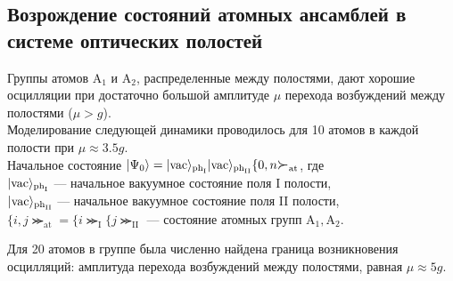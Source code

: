\subsection{Возрождение состояний атомных ансамблей в системе оптических полостей}
Группы атомов $\mathrm{A}_1$ и $\mathrm{A}_2$, распределенные между полостями, дают хорошие осцилляции при достаточно большой амплитуде $\mu$ перехода возбуждений между полостями ($\mu>g$). 
\\[12pt]
Моделирование следующей динамики проводилось для 10 атомов в каждой полости при $\mu \approx 3.5g$.
\\[12pt]
Начальное состояние $|\Psi_0\ra=|\mathrm{vac}\ra_{\mathrm{ph}_\mathrm{I}}|\mathrm{vac}\ra_{\mathrm{ph}_{\mathrm{II}}}\{0, n\Succ_{\mathrm{at}}$, где
\\
\indent$|\mathrm{vac}\rangle_{\mathrm{ph}_\mathrm{I}}$ --- начальное вакуумное состояние поля I полости,
\\[6pt]
\indent$|\mathrm{vac}\rangle_{\mathrm{ph}_{\mathrm{II}}}$ --- начальное вакуумное состояние поля II полости,
\\[6pt]
\indent$\{i,j\Succ_{\mathrm{at}} = \{i\Succ_{\mathrm{I}}\{j\Succ_{\mathrm{II}}$ --- состояние атомных групп $\mathrm{A}_1, \mathrm{A}_2$.
\begin{figure}[h!]
	\noindent{}
\end{figure}

\clearpage
Для 20 атомов в группе была численно найдена граница возникновения осцилляций: амплитуда перехода возбуждений между полостями, равная $\mu \approx 5g$.
\begin{figure}[h!]
	\noindent{}
\end{figure}

